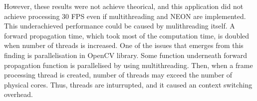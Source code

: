     However, these results were not achieve theorical,
    and this application did not achieve processing 30 FPS even if
    multithreading and NEON are implemented.
    This underachieved performance could be caused by mulithreading itself.
    A forward propagation time, which took most of the computation time, is doubled when number of threads is increased.
        One of the issues that emerges from this finding is parallelisation in OpenCV library.
        Some function underneath forward propagation function is parallelised by using multithreading.
        Then, when a frame processing thread is created, number of threads may exceed the number of physical cores.
        Thus, threads are inturrupted, and it caused an context switching overhead.